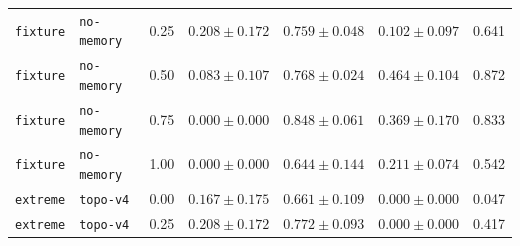 \documentclass{article}
\begin{document}
\begin{center}
\begin{tabular}{lllcccc}
\texttt{fixture} & \texttt{no-memory} & 0.25 & $0.208 \pm 0.172$ & $0.759 \pm 0.048$ & $0.102 \pm 0.097$ & 0.641 \\
\texttt{fixture} & \texttt{no-memory} & 0.50 & $0.083 \pm 0.107$ & $0.768 \pm 0.024$ & $0.464 \pm 0.104$ & 0.872 \\
\texttt{fixture} & \texttt{no-memory} & 0.75 & $0.000 \pm 0.000$ & $0.848 \pm 0.061$ & $0.369 \pm 0.170$ & 0.833 \\
\texttt{fixture} & \texttt{no-memory} & 1.00 & $0.000 \pm 0.000$ & $0.644 \pm 0.144$ & $0.211 \pm 0.074$ & 0.542 \\
\texttt{extreme} & \texttt{topo-v4} & 0.00 & $0.167 \pm 0.175$ & $0.661 \pm 0.109$ & $0.000 \pm 0.000$ & 0.047 \\
\texttt{extreme} & \texttt{topo-v4} & 0.25 & $0.208 \pm 0.172$ & $0.772 \pm 0.093$ & $0.000 \pm 0.000$ & 0.417 \\
\bottomrule
\end{tabular}
\end{center}
\end{document}
